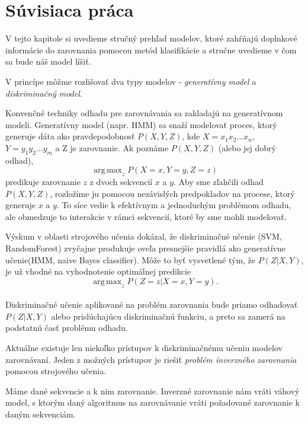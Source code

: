 \chapter{Súvisiaca práca}

V tejto kapitole si uvedieme stručný prehľad modelov, ktoré zahŕňajú doplnkové informácie do zarovnania pomocou metód klasifikácie a stručne uvedieme v čom sa bude náš model líšiť.

V princípe môžme rozlišovať dva typy modelov - \textit{generatívny model} a \textit{diskriminačný model}.

Konvenčné techniky odhadu pre zarovnávania sa zakladajú na generatívnom modeli. Generatívny model (napr. HMM) sa snaží modelovať proces, ktorý generuje dáta ako pravdepodobnosť $P(X,Y,Z)$, kde $X = x_1x_2\dots x_n$, $Y = y_1y_2\dots y_m$ a Z je zarovnanie. Ak poznáme $P(X,Y,Z)$ (alebo jej dobrý odhad),
$$\operatorname{ arg\,max}_z P(X = x,Y = y,Z = z)$$
predikuje zarovnanie $z$ z dvoch sekvencií $x$ a $y$. Aby sme zľahčili odhad $P(X,Y,Z)$, rozložíme ju pomocou nezávislých predpokladov na procese, ktorý generuje $x$ a $y$. To síce vedie k efektívnym a jednoduchým problémom odhadu, ale obmedzuje to interakcie v rámci sekvencií, ktoré by sme mohli modelovať. \cite{svmTrainingProteinsAlignment}

Výskum v oblasti strojového učenia dokázal, že diskriminačné učenie (SVM, RandomForest) zvyčajne produkuje oveľa presnejšie pravidlá ako generatívne učenie(HMM, naive Bayes classifier). \cite{svmTrainingProteinsAlignment}
Môže to byť vysvetlené tým, že $P(Z|X,Y)$, je už vhodné na vyhodnotenie optimálnej predikcie
$$\operatorname{ arg\,max}_z P(Z = z|X = x,Y = y).$$
\cite{svmTrainingProteinsAlignment}\\
Diskriminačné učenie aplikované na problém zarovnania bude priamo odhadovať $P(Z|X,Y)$ alebo prislúchajúcu diskriminačnú funkciu, a preto sa zamerá na podstatnú časť problému odhadu. \cite{svmTrainingProteinsAlignment}

Aktuálne existuje len niekoľko prístupov k diskriminačnému učeniu modelov zarovnávaní.
Jeden z možných prístupov je riešiť \textit{problém inverzného zarovnania} pomocou strojového učenia. \cite{svmTrainingProteinsAlignment}

\begin{df}
Máme dané sekvencie a k nim zarovnanie. Inverzné zarovnanie nám vráti váhový model, s ktorým daný algoritmus na zarovnávanie vráti požadované zarovnanie k daným sekvenciám.
\end{df}

